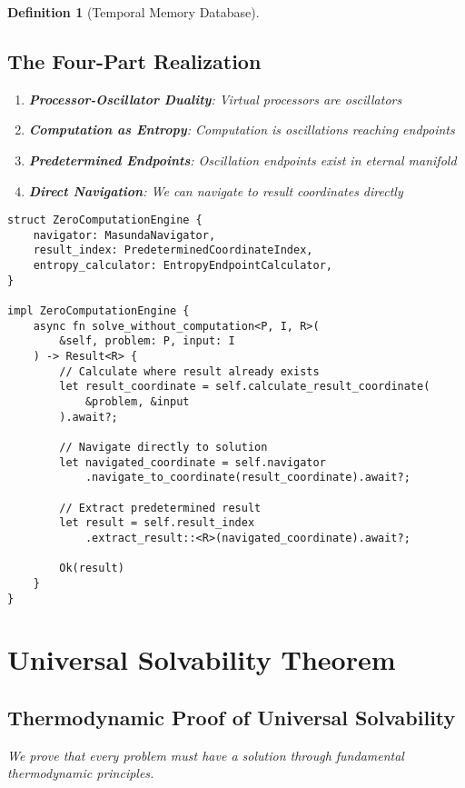 \documentclass[12pt]{article}
\newtheorem{definition}[theorem]{Definition}
\begin{document}
\begin{definition}[Temporal Memory Database]
\subsection{The Four-Part Realization}

\begin{enumerate}
    \item \textbf{Processor-Oscillator Duality}: Virtual processors are oscillators
    \item \textbf{Computation as Entropy}: Computation is oscillations reaching endpoints
    \item \textbf{Predetermined Endpoints}: Oscillation endpoints exist in eternal manifold
    \item \textbf{Direct Navigation}: We can navigate to result coordinates directly
\end{enumerate}

\begin{lstlisting}[caption=Zero Computation Engine Implementation]
struct ZeroComputationEngine {
    navigator: MasundaNavigator,
    result_index: PredeterminedCoordinateIndex,
    entropy_calculator: EntropyEndpointCalculator,
}

impl ZeroComputationEngine {
    async fn solve_without_computation<P, I, R>(
        &self, problem: P, input: I
    ) -> Result<R> {
        // Calculate where result already exists
        let result_coordinate = self.calculate_result_coordinate(
            &problem, &input
        ).await?;
        
        // Navigate directly to solution
        let navigated_coordinate = self.navigator
            .navigate_to_coordinate(result_coordinate).await?;
        
        // Extract predetermined result
        let result = self.result_index
            .extract_result::<R>(navigated_coordinate).await?;
        
        Ok(result)
    }
}
\end{lstlisting}

\section{Universal Solvability Theorem}

\subsection{Thermodynamic Proof of Universal Solvability}

We prove that every problem must have a solution through fundamental thermodynamic principles.


\end{definition}
\end{document}
